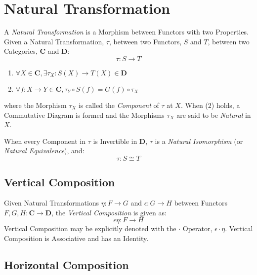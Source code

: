\section{Natural Transformation}\label{sec:natural_transformation}

A \emph{Natural Transformation} is a Morphism between Functors with
two Properties. Given a Natural Transformation, $\tau$, between two
Functors, $S$ and $T$, between two Categories, $\mathbf{C}$ and
$\mathbf{D}$:
\[
    \tau : S \rightarrow T
\]
\begin{enumerate}
    \item $\forall X \in \mathbf{C},
        \exists \tau_X : S(X) \rightarrow T(X) \in \mathbf{D}$
    \item $\forall f : X \rightarrow Y \in \mathbf{C},
        \tau_Y \circ S(f) = G(f) \circ \tau_X$
\end{enumerate}
where the Morphism $\tau_X$ is called the \emph{Component} of $\tau$
at $X$. When (2) holds, a Commutative Diagram is formed and the
Morphisms $\tau_X$ are said to be \emph{Natural} in $X$.

When every Component in $\tau$ is Invertible in $\mathbf{D}$, $\tau$
is a \emph{Natural Isomorphism} (or \emph{Natural Equivalence}), and:
\[
    \tau : S \cong T
\]



\subsection{Vertical Composition}\label{subsec:vertical_composition}

Given Natural Transformations $\eta : F \rightarrow G$ and $\epsilon :
G \rightarrow H$ between Functors $F,G,H : \mathbf{C} \rightarrow
\mathbf{D}$, the \emph{Vertical Composition} is given as:
\[
    \epsilon \eta : F \rightarrow H
\]
Vertical Composition may be explicitly denoted with the $\cdot$
Operator, $\epsilon \cdot \eta$. Vertical Composition is Associative
and has an Identity.



\subsection{Horizontal Composition}\label{subsec:horizontal_composition}

